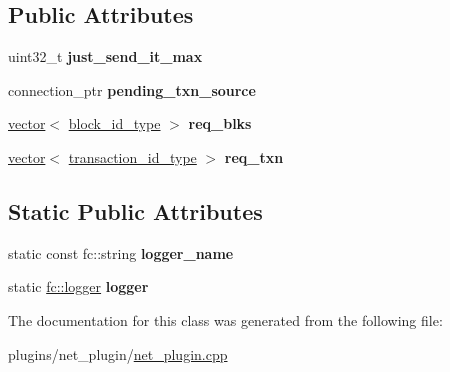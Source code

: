 \subsection*{Public Attributes}
\begin{DoxyCompactItemize}
\item 
\mbox{\label{classaacio_1_1big__msg__manager_a7a5af9cac032c175f7ada250b12c976e}} 
uint32\+\_\+t {\bfseries just\+\_\+send\+\_\+it\+\_\+max}
\item 
\mbox{\label{classaacio_1_1big__msg__manager_aad276225952aee5f1b3649c6895d02d9}} 
connection\+\_\+ptr {\bfseries pending\+\_\+txn\+\_\+source}
\item 
\mbox{\label{classaacio_1_1big__msg__manager_a7c056a6afc344f91ee10385812f3ec98}} 
\mbox{\hyperlink{classstd_1_1vector}{vector}}$<$ \mbox{\hyperlink{classfc_1_1sha256}{block\+\_\+id\+\_\+type}} $>$ {\bfseries req\+\_\+blks}
\item 
\mbox{\label{classaacio_1_1big__msg__manager_a87a0ee49fbf47e3ddbef92306cea21ab}} 
\mbox{\hyperlink{classstd_1_1vector}{vector}}$<$ \mbox{\hyperlink{classfc_1_1sha256}{transaction\+\_\+id\+\_\+type}} $>$ {\bfseries req\+\_\+txn}
\end{DoxyCompactItemize}
\subsection*{Static Public Attributes}
\begin{DoxyCompactItemize}
\item 
\mbox{\label{classaacio_1_1big__msg__manager_af38e182ccf190d793beb3d3c593ea380}} 
static const fc\+::string {\bfseries logger\+\_\+name}
\item 
\mbox{\label{classaacio_1_1big__msg__manager_a789c4cf5e10415101ef737b745281b0a}} 
static \mbox{\hyperlink{classfc_1_1logger}{fc\+::logger}} {\bfseries logger}
\end{DoxyCompactItemize}


The documentation for this class was generated from the following file\+:\begin{DoxyCompactItemize}
\item 
plugins/net\+\_\+plugin/\mbox{\hyperlink{net__plugin_8cpp}{net\+\_\+plugin.\+cpp}}\end{DoxyCompactItemize}
